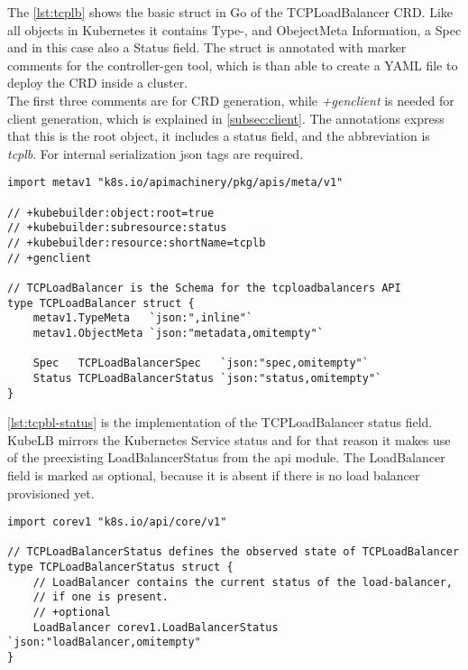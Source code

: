 The \autoref{lst:tcplb} shows the basic struct in Go of the TCPLoadBalancer CRD.
Like all objects in Kubernetes it contains Type-, and ObejectMeta Information, a Spec and in this case also a Status field.
The struct is annotated with marker comments for the controller-gen tool, which is than able to create a YAML file to deploy the CRD inside a cluster.
\\
The first three comments are for CRD generation, while \textit{+genclient} is needed for client generation, which is explained in \autoref{subsec:client}.
The annotations express that this is the root object, it includes a status field, and the abbreviation is \textit{tcplb}.
For internal serialization json tags are required.

\begin{lstlisting}[caption={TCPLoadBalancer CRD root struct},label={lst:tcplb}]
import metav1 "k8s.io/apimachinery/pkg/apis/meta/v1"

// +kubebuilder:object:root=true
// +kubebuilder:subresource:status
// +kubebuilder:resource:shortName=tcplb
// +genclient

// TCPLoadBalancer is the Schema for the tcploadbalancers API
type TCPLoadBalancer struct {
	metav1.TypeMeta   `json:",inline"`
	metav1.ObjectMeta `json:"metadata,omitempty"`

	Spec   TCPLoadBalancerSpec   `json:"spec,omitempty"`
	Status TCPLoadBalancerStatus `json:"status,omitempty"`
}
\end{lstlisting}

\newpage

\autoref{lst:tcpbl-status} is the implementation of the TCPLoadBalancer status field.
KubeLB mirrors the Kubernetes Service status and for that reason it makes use of the preexisting LoadBalancerStatus from the api module.
The LoadBalancer field is marked as optional, because it is absent if there is no load balancer provisioned yet.

\begin{lstlisting}[caption={TCPLoadBalancerStatus struct}, label={lst:tcpbl-status}]
import corev1 "k8s.io/api/core/v1"

// TCPLoadBalancerStatus defines the observed state of TCPLoadBalancer
type TCPLoadBalancerStatus struct {
	// LoadBalancer contains the current status of the load-balancer,
	// if one is present.
	// +optional
	LoadBalancer corev1.LoadBalancerStatus `json:"loadBalancer,omitempty"
}
\end{lstlisting}

